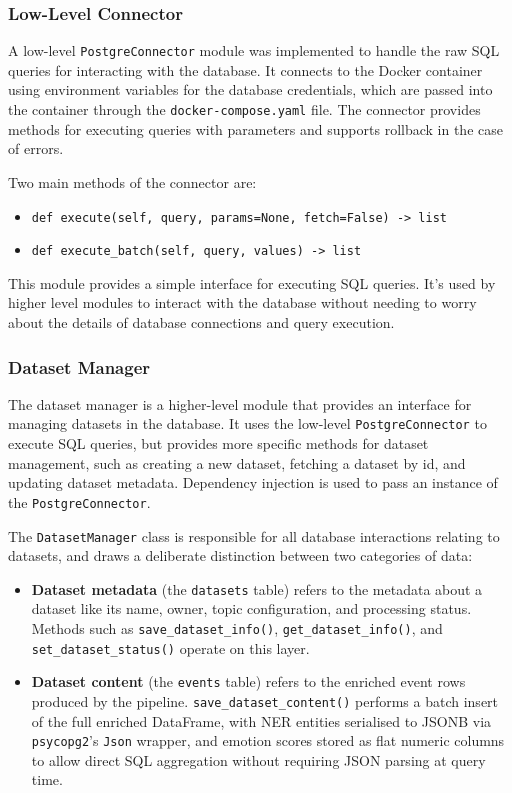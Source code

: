 \documentclass[12pt, a4paper]{article}
\begin{document}
\subsubsection{Low-Level Connector}
A low-level \texttt{PostgreConnector} module was implemented to handle the raw SQL queries for interacting with the database. It connects to the Docker container using environment variables for the database credentials, which are passed into the container through the \texttt{docker-compose.yaml} file. The connector provides methods for executing queries with parameters and supports rollback in the case of errors.

 Two main methods of the connector are:
\begin{itemize}
    \item \texttt{def execute(self, query, params=None, fetch=False) -> list}
    \item \texttt{def execute\_batch(self, query, values) -> list}
\end{itemize}

This module provides a simple interface for executing SQL queries. It's used by higher level modules to interact with the database without needing to worry about the details of database connections and query execution.

\subsubsection{Dataset Manager}
The dataset manager is a higher-level module that provides an interface for managing datasets in the database. It uses the low-level \texttt{PostgreConnector} to execute SQL queries, but provides more specific methods for dataset management, such as creating a new dataset, fetching a dataset by id, and updating dataset metadata. Dependency injection is used to pass an instance of the \texttt{PostgreConnector}.

The \texttt{DatasetManager} class is responsible for all database interactions relating to datasets, and draws a deliberate distinction between two categories of data:
\begin{itemize}
    \item \textbf{Dataset metadata} (the \texttt{datasets} table) refers to the metadata about a dataset like its name, owner, topic configuration, and processing status. Methods such as \texttt{save\_dataset\_info()}, \texttt{get\_dataset\_info()}, and \texttt{set\_dataset\_status()} operate on this layer.
    \item \textbf{Dataset content} (the \texttt{events} table) refers to the enriched event rows produced by the pipeline. \texttt{save\_dataset\_content()} performs a batch insert of the full enriched DataFrame, with NER entities serialised to JSONB via \texttt{psycopg2}'s \texttt{Json} wrapper, and emotion scores stored as flat numeric columns to allow direct SQL aggregation without requiring JSON parsing at query time.
\end{itemize}
\end{document}
